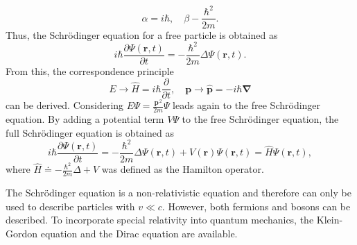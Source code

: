 \documentclass{report}
\numberwithin{tm}{section}
\newcommand\vect[1]{\ensuremath{\bm{#1}}}
\begin{document}
\begin{equation}
		\alpha = i\hbar, \quad \beta -\frac{\hbar^2}{2m}.
	\end{equation} Thus, the Schrödinger equation for a free particle is obtained as \begin{equation}\label{freieschroedingergleichung}
		i\hbar\frac{\partial \Psi(\vect{r},t)}{\partial t} = -\frac{\hbar^2}{2m}\Delta \Psi(\vect{r},t).
	\end{equation} From this, the correspondence principle \begin{equation}\label{korrespondenzprinzip}
		E \rightarrow \hat{H} = i\hbar\frac{\partial}{\partial t}, \quad \vect{p} \rightarrow \hat{\vect{p}} = -i\hbar\vect{\nabla}
	\end{equation} can be derived. Considering $E \Psi = \frac{\vect{p}^{\,2}}{2m}\Psi$ leads again to the free Schrödinger equation.
	By adding a potential term $V\Psi$ to the free Schrödinger equation, the full Schrödinger equation is obtained as \begin{equation}\label{schroedingergleichung}
		i\hbar\frac{\partial \Psi(\vect{r},t)}{\partial t} = -\frac{\hbar^2}{2m}\Delta \Psi(\vect{r},t) + V(\vect{r})\Psi(\vect{r},t) = \hat{H}\Psi(\vect{r},t),
	\end{equation} where $\hat{H} \doteq -\frac{\hbar^2}{2m}\Delta + V$ was defined as the Hamilton operator.
	
	The Schrödinger equation is a non-relativistic equation and therefore can only be used to describe particles with $v \ll c$. However, both fermions and bosons can be described. To incorporate special relativity into quantum mechanics, the Klein-Gordon equation and the Dirac equation are available.
	
\end{document}
